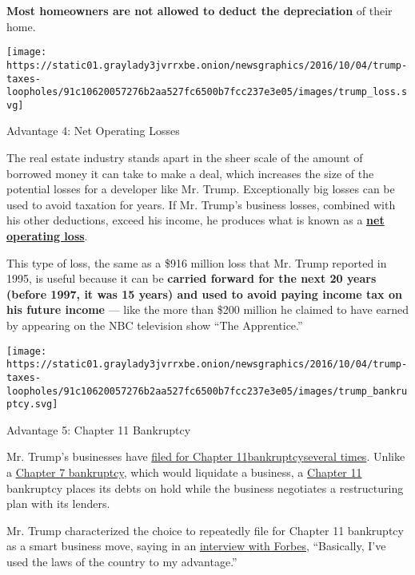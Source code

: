 \textbf{Most homeowners are not allowed to deduct the depreciation} of
their home.

\texttt{[image: https://static01.graylady3jvrrxbe.onion/newsgraphics/2016/10/04/trump-taxes-loopholes/91c10620057276b2aa527fc6500b7fcc237e3e05/images/trump\_loss.svg]}

Advantage 4: Net Operating Losses

The real estate industry stands apart in the sheer scale of the amount
of borrowed money it can take to make a deal, which increases the size
of the potential losses for a developer like Mr. Trump. Exceptionally
big losses can be used to avoid taxation for years. If Mr. Trump's
business losses, combined with his other deductions, exceed his income,
he produces what is known as a
\textbf{\href{https://www.irs.gov/publications/p536/ar02.html}{net
operating loss}}.

This type of loss, the same as a \$916 million loss that Mr. Trump
reported in 1995, is useful because it can be \textbf{carried forward
for the next 20 years (before 1997, it was 15 years) and used to avoid
paying income tax on his future income} --- like the more than \$200
million he claimed to have earned by appearing on the NBC television
show ``The Apprentice.''

\texttt{[image: https://static01.graylady3jvrrxbe.onion/newsgraphics/2016/10/04/trump-taxes-loopholes/91c10620057276b2aa527fc6500b7fcc237e3e05/images/trump\_bankruptcy.svg]}

Advantage 5: Chapter 11 Bankruptcy

Mr. Trump's businesses have
\href{http://www.politifact.com/truth-o-meter/statements/2016/jun/21/hillary-clinton/yep-donald-trumps-companies-have-declared-bankrupt/}{filed
for Chapter
11}\href{http://www.politifact.com/truth-o-meter/statements/2016/jun/21/hillary-clinton/yep-donald-trumps-companies-have-declared-bankrupt/}{bankruptcy}\href{http://www.politifact.com/truth-o-meter/statements/2016/jun/21/hillary-clinton/yep-donald-trumps-companies-have-declared-bankrupt/}{several
times}. Unlike a
\href{https://www.irs.gov/businesses/small-businesses-self-employed/chapter-7-bankruptcy-liquidation-under-the-bankruptcy-code}{Chapter
7 bankruptcy}, which would liquidate a business, a
\href{https://www.irs.gov/businesses/small-businesses-self-employed/chapter-11-bankruptcy-reorganization}{Chapter
11} bankruptcy places its debts on hold while the business negotiates a
restructuring plan with its lenders.

Mr. Trump characterized the choice to repeatedly file for Chapter 11
bankruptcy as a smart business move, saying in an
\href{http://www.forbes.com/sites/clareoconnor/2011/04/29/fourth-times-a-charm-how-donald-trump-made-bankruptcy-work-for-him/}{interview
with Forbes}, ``Basically, I've used the laws of the country to my
advantage.''


